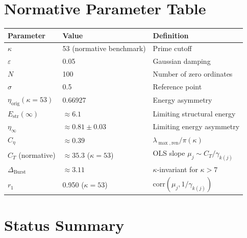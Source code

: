 \documentclass[11pt]{article}
\newcommand{\Estr}{E_{\mathrm{str}}}
\newcommand{\etaorig}{\eta_{\mathrm{orig}}}
\newcommand{\Ceta}{C_{\eta}}
\newcommand{\CT}{C_{T}}
\newcommand{\Dburstvar}{\Delta_{\mathrm{Burst}}}
\begin{document}
\appendix

\section{Normative Parameter Table}

\begin{center}
\renewcommand{\arraystretch}{1.3}
\begin{tabular}{lll}
\toprule
Parameter & Value & Definition \\
\midrule
$\kappa$ & 53 (normative benchmark) & Prime cutoff \\
$\varepsilon$ & 0.05 & Gaussian damping \\
$N$ & 100 & Number of zero ordinates \\
$\sigma$ & 0.5 & Reference point \\
$\etaorig(\kappa=53)$ & 0.66927 & Energy asymmetry \\
$\Estr(\infty)$ & $\approx 6.1$ & Limiting structural energy \\
$\eta_\infty$ & $\approx 0.81\pm 0.03$ & Limiting energy asymmetry \\
$\Ceta$ & $\approx 0.39$ & $\lambda_{\max,\mathrm{ren}}/\pi(\kappa)$ \\
$\CT$ (normative) & $\approx 35.3$ ($\kappa=53$)
  & OLS slope $\mu_j\sim\CT/\gamma_{k(j)}$ \\
$\Dburstvar$ & $\approx 3.11$ & $\kappa$-invariant for $\kappa > 7$ \\
$r_1$ & 0.950 ($\kappa=53$)
  & $\mathrm{corr}(\mu_j, 1/\gamma_{k(j)})$ \\
\bottomrule
\end{tabular}
\end{center}

\section{Status Summary}
\end{document}
